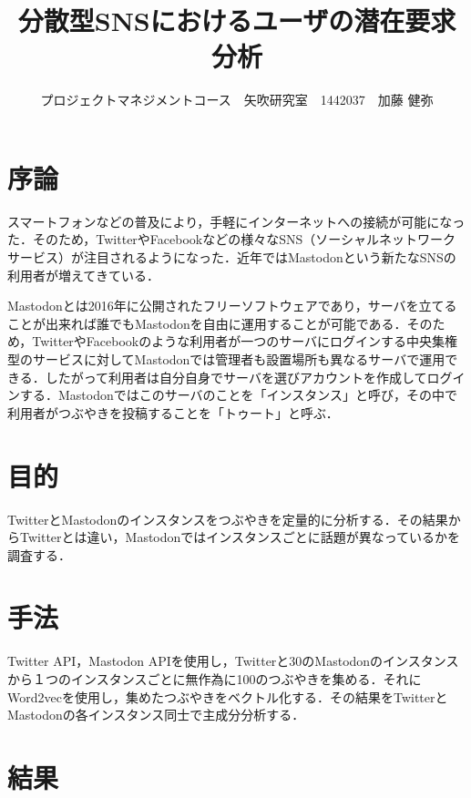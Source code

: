 \documentclass[uplatex,twocolumn,dvipdfmx]{jsarticle}
\title{\vspace{-5mm}\fontsize{14pt}{0pt}\selectfont 分散型SNSにおけるユーザの潜在要求分析}
\author{\normalsize プロジェクトマネジメントコース　矢吹研究室　1442037　加藤 健弥}
\date{}
\begin{document}
\fontsize{10.5pt}{\baselineskip}\selectfont
\maketitle





\section{序論}\label{序論}
スマートフォンなどの普及により，手軽にインターネットへの接続が可能になった．そのため，TwitterやFacebookなどの様々なSNS（ソーシャルネットワークサービス）が注目されるようになった．近年ではMastodonという新たなSNSの利用者が増えてきている．

Mastodonとは2016年に公開されたフリーソフトウェアであり，サーバを立てることが出来れば誰でもMastodonを自由に運用することが可能である．そのため，TwitterやFacebookのような利用者が一つのサーバにログインする中央集権型のサービスに対してMastodonでは管理者も設置場所も異なるサーバで運用できる．したがって利用者は自分自身でサーバを選びアカウントを作成してログインする．Mastodonではこのサーバのことを「インスタンス」と呼び，その中で利用者がつぶやきを投稿することを「トゥート」と呼ぶ\cite{Mastodon}．


\section{目的}

TwitterとMastodonのインスタンスをつぶやきを定量的に分析する．その結果からTwitterとは違い，Mastodonではインスタンスごとに話題が異なっているかを調査する．

\section{手法}

Twitter API，Mastodon APIを使用し，Twitterと30のMastodonのインスタンスから１つのインスタンスごとに無作為に100のつぶやきを集める．それにWord2vecを使用し，集めたつぶやきをベクトル化する．その結果をTwitterとMastodonの各インスタンス同士で主成分分析する．


\section{結果}
\end{document}
